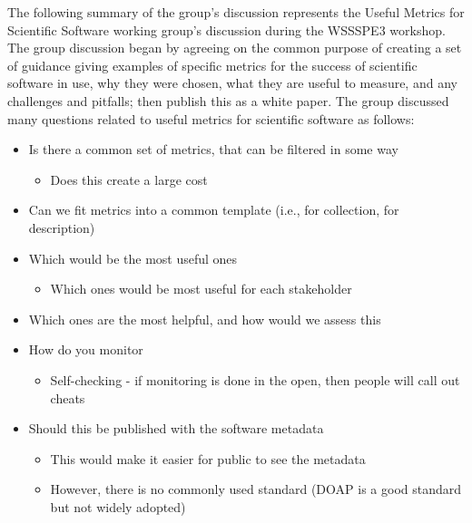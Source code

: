 The following summary of the group's discussion represents the Useful Metrics
for Scientific Software working group's discussion during the WSSSPE3 workshop.
The group discussion began by agreeing on the common purpose of creating a set
of guidance giving examples of specific metrics for the success of scientific
software in use, why they were chosen, what they are useful to measure, and any
challenges and pitfalls; then publish this as a white paper. The group discussed
many questions related to useful metrics for scientific software as follows:
\begin{itemize}

\item
Is there a common set of metrics, that can be filtered in some way

\begin{itemize}
\item
        Does this create a large cost
\end{itemize}

\item
Can we fit metrics into a common template (i.e., for collection, for description)

\item
Which would be the most useful ones

\begin{itemize}
\item
        Which ones would be most useful for each stakeholder
\end{itemize}

\item
Which ones are the most helpful, and how would we assess this

\item
How do you monitor

\begin{itemize}
\item
        Self-checking - if monitoring is done in the open, then people will call out cheats
\end{itemize}

\item
Should this be published with the software metadata

\begin{itemize}
\item
        This would make it easier for public to see the metadata

\item
However, there is no commonly used standard (DOAP is a good standard but not
widely adopted)


\end{itemize}
\end{itemize}
